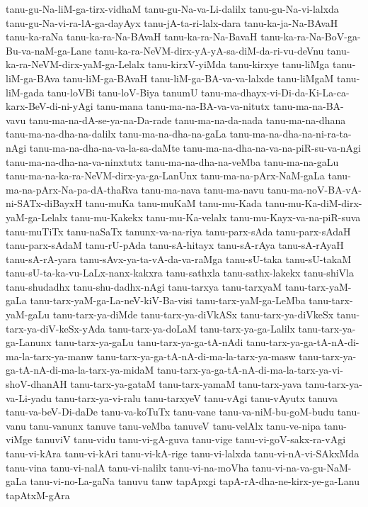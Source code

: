 {tanu-gu-Na-liM-ga-tirx-vidhaM
tanu-gu-Na-va-Li-dalilx
tanu-gu-Na-vi-lalxda
tanu-gu-Na-vi-ra-lA-ga-dayAyx
tanu-jA-ta-ri-lalx-dara
tanu-ka-ja-Na-BAvaH
tanu-ka-raNa
tanu-ka-ra-Na-BAvaH
tanu-ka-ra-Na-BavaH
tanu-ka-ra-Na-BoV-ga-Bu-va-naM-ga-Lane
tanu-ka-ra-NeVM-dirx-yA-yA-sa-diM-da-ri-vu-deVnu
tanu-ka-ra-NeVM-dirx-yaM-ga-Lelalx
tanu-kirxV-yiMda
tanu-kirxye
tanu-liMga
tanu-liM-ga-BAva
tanu-liM-ga-BAvaH
tanu-liM-ga-BA-va-va-lalxde
tanu-liMgaM
tanu-liM-gada
tanu-loVBi
tanu-loV-Biya
tanumU
tanu-ma-dhayx-vi-Di-da-Ki-La-ca-karx-BeV-di-ni-yAgi
tanu-mana
tanu-ma-na-BA-va-va-nitutx
tanu-ma-na-BA-vavu
tanu-ma-na-dA-se-ya-na-Da-rade
tanu-ma-na-da-nada
tanu-ma-na-dhana
tanu-ma-na-dha-na-dalilx
tanu-ma-na-dha-na-gaLa
tanu-ma-na-dha-na-ni-ra-ta-nAgi
tanu-ma-na-dha-na-va-la-sa-daMte
tanu-ma-na-dha-na-va-na-piR-su-va-nAgi
tanu-ma-na-dha-na-va-ninxtutx
tanu-ma-na-dha-na-veMba
tanu-ma-na-gaLu
tanu-ma-na-ka-ra-NeVM-dirx-ya-ga-LanUnx
tanu-ma-na-pArx-NaM-gaLa
tanu-ma-na-pArx-Na-pa-dA-thaRva
tanu-ma-nava
tanu-ma-navu
tanu-ma-noV-BA-vA-ni-SATx-diBayxH
tanu-muKa
tanu-muKaM
tanu-mu-Kada
tanu-mu-Ka-diM-dirx-yaM-ga-Lelalx
tanu-mu-Kakekx
tanu-mu-Ka-velalx
tanu-mu-Kayx-va-na-piR-suva
tanu-muTiTx
tanu-naSaTx
tanunx-va-na-riya
tanu-parx-sAda
tanu-parx-sAdaH
tanu-parx-sAdaM
tanu-rU-pAda
tanu-sA-hitayx
tanu-sA-rAya
tanu-sA-rAyaH
tanu-sA-rA-yara
tanu-sAvx-ya-ta-vA-da-va-raMga
tanu-sU-taka
tanu-sU-takaM
tanu-sU-ta-ka-vu-LaLx-nanx-kakxra
tanu-sathxla
tanu-sathx-lakekx
tanu-shiVla
tanu-shudadhx
tanu-shu-dadhx-nAgi
tanu-tarxya
tanu-tarxyaM
tanu-tarx-yaM-gaLa
tanu-tarx-yaM-ga-La-neV-kiV-Ba-visi
tanu-tarx-yaM-ga-LeMba
tanu-tarx-yaM-gaLu
tanu-tarx-ya-diMde
tanu-tarx-ya-diVkASx
tanu-tarx-ya-diVkeSx
tanu-tarx-ya-diV-keSx-yAda
tanu-tarx-ya-doLaM
tanu-tarx-ya-ga-Lalilx
tanu-tarx-ya-ga-Lanunx
tanu-tarx-ya-gaLu
tanu-tarx-ya-ga-tA-nAdi
tanu-tarx-ya-ga-tA-nA-di-ma-la-tarx-ya-manw
tanu-tarx-ya-ga-tA-nA-di-ma-la-tarx-ya-masw
tanu-tarx-ya-ga-tA-nA-di-ma-la-tarx-ya-midaM
tanu-tarx-ya-ga-tA-nA-di-ma-la-tarx-ya-vi-shoV-dhanAH
tanu-tarx-ya-gataM
tanu-tarx-yamaM
tanu-tarx-yava
tanu-tarx-ya-va-Li-yadu
tanu-tarx-ya-vi-ralu
tanu-tarxyeV
tanu-vAgi
tanu-vAyutx
tanuva
tanu-va-beV-Di-daDe
tanu-va-koTuTx
tanu-vane
tanu-va-niM-bu-goM-budu
tanu-vanu
tanu-vanunx
tanuve
tanu-veMba
tanuveV
tanu-velAlx
tanu-ve-nipa
tanu-viMge
tanuviV
tanu-vidu
tanu-vi-gA-guva
tanu-vige
tanu-vi-goV-sakx-ra-vAgi
tanu-vi-kAra
tanu-vi-kAri
tanu-vi-kA-rige
tanu-vi-lalxda
tanu-vi-nA-vi-SAkxMda
tanu-vina
tanu-vi-nalA
tanu-vi-nalilx
tanu-vi-na-moVha
tanu-vi-na-va-gu-NaM-gaLa
tanu-vi-no-La-gaNa
tanuvu
tanw
tapApxgi
tapA-rA-dha-ne-kirx-ye-ga-Lanu
tapAtxM-gAra
}
